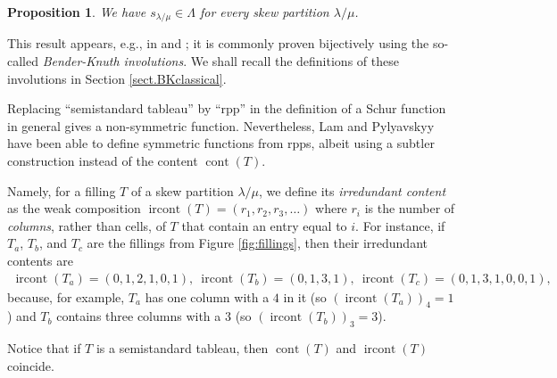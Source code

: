 \documentclass[12pt]{article}
\theoremstyle{plain}
\newtheorem{proposition}[theorem]{Proposition}
\theoremstyle{definition}
\def\ircont{{\operatorname{ircont}}}
\def\cont{{\operatorname{cont}}}
\def\lm{{\lambda/\mu}}
\begin{document}
 
\begin{proposition}
\label{prop.schur.symm}We have $s_{\lambda/\mu}\in\Lambda$ for every skew
partition $\lambda/\mu$.
\end{proposition}

This result appears, e.g., in \cite[Theorem 7.10.2]{Stan99} and
\cite[Proposition 2.11]{GriRei15}; it is commonly proven bijectively using the
so-called \textit{Bender-Knuth involutions}. We shall recall the definitions
of these involutions in Section \ref{sect.BKclassical}.


 Replacing ``semistandard
tableau'' by ``rpp'' in the
definition of a Schur function in general gives a non-symmetric function. Nevertheless, Lam
and Pylyavskyy \cite[\S 9]{LamPyl} have been able to define
symmetric functions from rpps, albeit using a subtler construction
instead of the content $\operatorname{cont}\left(  T\right)$.



  Namely, for a filling $T$ of a skew partition $\lm$, we define its
\textit{irredundant content} as the weak composition
$\ircont\left( T\right) = \left(r_1,r_2,r_3,\dots\right)$
where $r_i$ is the number of \emph{columns}, rather than cells, of $T$
that contain an entry equal to $i$.
For instance, if $T_a$, $T_b$, and $T_c$ are the fillings from
Figure \ref{fig:fillings}, then their irredundant contents are
\begin{align*}
\ircont(T_a)=(0,1,2,1,0,1),\ \ircont(T_b)=(0,1,3,1),\ \ircont(T_c)=(0,1,3,1,0,0,1),
\end{align*}
because, for example, $T_a$ has one column with a $4$ in it (so $(\ircont(T_a))_4=1$)
and $T_b$ contains three columns with a $3$ (so $(\ircont(T_b))_3=3$).

Notice that if $T$ is a semistandard tableau, then $\cont(T)$ and $\ircont(T)$ coincide.
\end{document}
